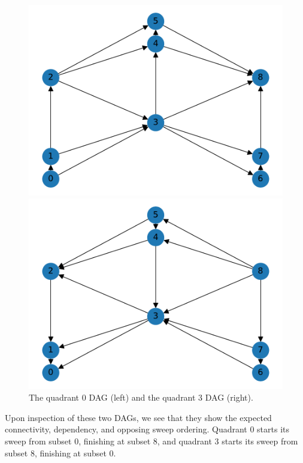 \documentclass[times,final]{elsarticle}
\begin{document}
\begin{figure}[H]
\begin{minipage}[c]{0.5\textwidth}
\includegraphics[scale=0.5]{../figures/9_graph0.pdf}
\end{minipage}
\begin{minipage}[c]{0.5\textwidth}
\includegraphics[scale=0.5]{../figures/9_graph3.pdf}
\end{minipage}
\caption{The quadrant 0 DAG (left) and the quadrant 3 DAG (right).}
\label{25_q0q3graphs}
\end{figure}
Upon inspection of these two DAGs, we see that they show the expected connectivity, dependency, and opposing sweep ordering.
Quadrant 0 starts its sweep from subset 0, finishing at subset 8, and quadrant 3 starts its sweep from subset 8, finishing at subset 0.
\end{document}
